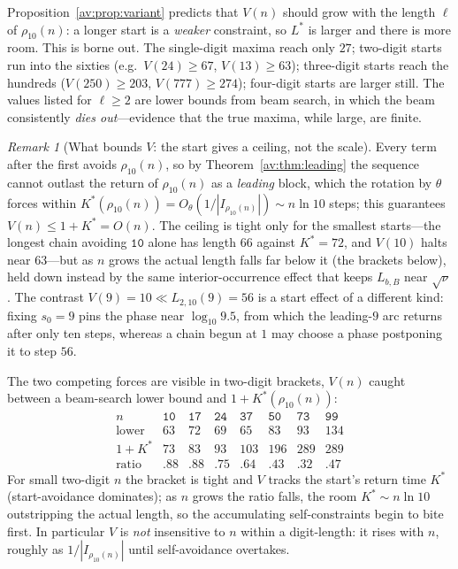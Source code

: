 \documentclass[a4paper]{article}
\theoremstyle{plain}
\theoremstyle{definition}
\theoremstyle{remark}
\newtheorem{remark}{Remark}[subsection]
\newcommand{\Lbb}[1][b,B]{L_{#1}}
\begin{document}
Proposition~\ref{av:prop:variant} predicts that $V(n)$ should grow with the length $\ell$ of $\rho_{10}(n)$: a longer start is a \emph{weaker} constraint, so $L^{*}$ is larger and there is more room. This is borne out. The single-digit maxima reach only $27$; two-digit starts run into the sixties (e.g.\ $V(24)\ge 67$, $V(13)\ge 63$); three-digit starts reach the hundreds ($V(250)\ge 203$, $V(777)\ge 274$); four-digit starts are larger still. The values listed for $\ell\ge2$ are lower bounds from beam search, in which the beam consistently \emph{dies out}---evidence that the true maxima, while large, are finite.

\begin{remark}[What bounds $V$: the start gives a ceiling, not the scale]
Every term after the first avoids $\rho_{10}(n)$, so by Theorem~\ref{av:thm:leading} the sequence cannot outlast the return of $\rho_{10}(n)$ as a \emph{leading} block, which the rotation by $\theta$ forces within $K^{*}(\rho_{10}(n))=O_\theta(1/|I_{\rho_{10}(n)}|)\sim n\ln10$ steps; this guarantees $V(n)\le1+K^{*}=O(n)$. The ceiling is tight only for the smallest starts---the longest chain avoiding $\texttt{10}$ alone has length $66$ against $K^{*}=72$, and $V(10)$ halts near $63$---but as $n$ grows the actual length falls far below it (the brackets below), held down instead by the same interior-occurrence effect that keeps $\Lbb$ near $\sqrt\nu$. The contrast $V(9)=10\ll L_{2,10}(9)=56$ is a start effect of a different kind: fixing $s_0=9$ pins the phase near $\log_{10}9.5$, from which the leading-$9$ arc returns after only ten steps, whereas a chain begun at $1$ may choose a phase postponing it to step $56$.
\end{remark}

The two competing forces are visible in two-digit brackets, $V(n)$ caught between a beam-search lower bound and $1+K^{*}(\rho_{10}(n))$:
\[
\begin{array}{c|ccccccc}
n & \texttt{10}&\texttt{17}&\texttt{24}&\texttt{37}&\texttt{50}&\texttt{73}&\texttt{99}\\\hline
\text{lower} & 63&72&69&65&83&93&134\\[1pt]
1+K^{*} & 73&83&93&103&196&289&289\\[1pt]
\text{ratio} & .88&.88&.75&.64&.43&.32&.47
\end{array}
\]
For small two-digit $n$ the bracket is tight and $V$ tracks the start's return time $K^{*}$ (start-avoidance dominates); as $n$ grows the ratio falls, the room $K^{*}\sim n\ln10$ outstripping the actual length, so the accumulating self-constraints begin to bite first. In particular $V$ is \emph{not} insensitive to $n$ within a digit-length: it rises with $n$, roughly as $1/|I_{\rho_{10}(n)}|$ until self-avoidance overtakes.
\end{document}
